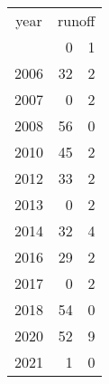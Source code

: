 \footnotesize\begin{tabular}[t]{lrr}
\toprule
\multicolumn{1}{c}{year} & \multicolumn{2}{c}{runoff} \\
\cmidrule(l{3pt}r{3pt}){1-1} \cmidrule(l{3pt}r{3pt}){2-3}
  & 0 & 1\\
\midrule
2006 & 32 & 2\\
2007 & 0 & 2\\
2008 & 56 & 0\\
2010 & 45 & 2\\
2012 & 33 & 2\\
2013 & 0 & 2\\
2014 & 32 & 4\\
2016 & 29 & 2\\
2017 & 0 & 2\\
2018 & 54 & 0\\
2020 & 52 & 9\\
2021 & 1 & 0\\
\bottomrule
\end{tabular}
